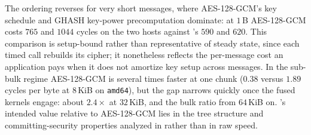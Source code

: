 The ordering reverses for very short messages, where AES-128-GCM's key schedule
and GHASH key-power precomputation dominate: at $1$\,B AES-128-GCM costs $765$
and $1044$ cycles on the two hosts against \TW{}'s $590$ and $620$. This
comparison is setup-bound rather than representative of steady state, since each
timed call rebuilds its cipher; it nonetheless reflects the per-message cost an
application pays when it does not amortize key setup across messages. In the
sub-bulk regime AES-128-GCM is several times faster at one chunk ($0.38$ versus
$1.89$ cycles per byte at $8$\,KiB on \texttt{amd64}), but the gap narrows
quickly once the fused kernels engage: about $2.4\times$ at $32$\,KiB, and the
bulk ratio from $64$\,KiB on. \TW{}'s intended value relative to AES-128-GCM
lies in the tree structure and committing-security properties analyzed in
 rather than in raw speed.
